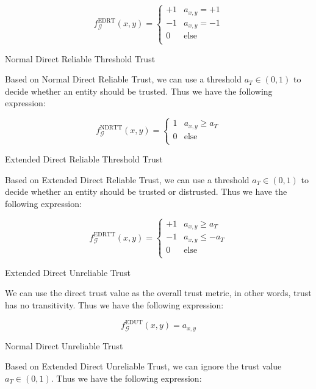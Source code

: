 \documentclass{article}
\begin{document}
\begin{equation}
f_{\mathcal{G}}^{\text{EDRT}}(x,y)=\left\{
\begin{array}{cc}
 +1 & a_{x,y}=+1 \\
 -1 & a_{x,y}=-1 \\
 0 & \text{else} \\
\end{array}
\right.
\end{equation}

Normal Direct Reliable Threshold Trust

Based on Normal Direct Reliable Trust, we can use a threshold \(a_T\in (0,1)\) to decide whether an entity should be trusted. Thus we have the following
expression:

\begin{equation}
f_{\mathcal{G}}^{\text{NDRTT}}(x,y)=\left\{
\begin{array}{cc}
 1 & a_{x,y}\geq a_T \\
 0 & \text{else} \\
\end{array}
\right.
\end{equation}

Extended Direct Reliable Threshold Trust

Based on Extended Direct Reliable Trust, we can use a threshold \(a_T\in (0,1)\) to decide whether an entity should be trusted or distrusted. Thus
we have the following expression:

\begin{equation}
f_{\mathcal{G}}^{\text{EDRTT}}(x,y)=\left\{
\begin{array}{cc}
 +1 & a_{x,y}\geq a_T \\
 -1 & a_{x,y}\leq -a_T \\
 0 & \text{else} \\
\end{array}
\right.
\end{equation}

Extended Direct Unreliable Trust

We can use the direct trust value as the overall trust metric, in other words, trust has no transitivity. Thus we have the following expression:

\begin{equation}
f_{\mathcal{G}}^{\text{EDUT}}(x,y)=a_{x,y}
\end{equation}

Normal Direct Unreliable Trust

Based on Extended Direct Unreliable Trust, we can ignore the trust value \(a_T\in (0,1)\). Thus we have the following expression:
\end{document}
